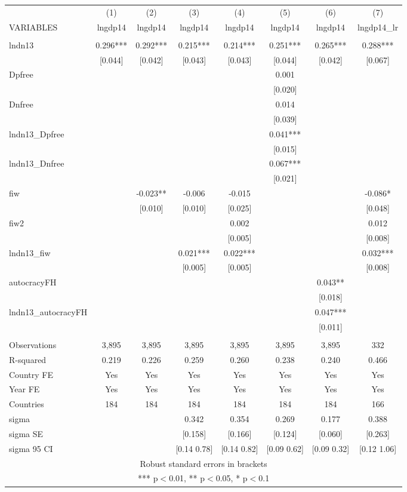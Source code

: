 \begin{tabular}{lccccccc} \hline
 & (1) & (2) & (3) & (4) & (5) & (6) & (7) \\
VARIABLES & lngdp14 & lngdp14 & lngdp14 & lngdp14 & lngdp14 & lngdp14 & lngdp14\_lr \\ \hline
 &  &  &  &  &  &  &  \\
lndn13 & 0.296*** & 0.292*** & 0.215*** & 0.214*** & 0.251*** & 0.265*** & 0.288*** \\
 & [0.044] & [0.042] & [0.043] & [0.043] & [0.044] & [0.042] & [0.067] \\
Dpfree &  &  &  &  & 0.001 &  &  \\
 &  &  &  &  & [0.020] &  &  \\
Dnfree &  &  &  &  & 0.014 &  &  \\
 &  &  &  &  & [0.039] &  &  \\
lndn13\_Dpfree &  &  &  &  & 0.041*** &  &  \\
 &  &  &  &  & [0.015] &  &  \\
lndn13\_Dnfree &  &  &  &  & 0.067*** &  &  \\
 &  &  &  &  & [0.021] &  &  \\
fiw &  & -0.023** & -0.006 & -0.015 &  &  & -0.086* \\
 &  & [0.010] & [0.010] & [0.025] &  &  & [0.048] \\
fiw2 &  &  &  & 0.002 &  &  & 0.012 \\
 &  &  &  & [0.005] &  &  & [0.008] \\
lndn13\_fiw &  &  & 0.021*** & 0.022*** &  &  & 0.032*** \\
 &  &  & [0.005] & [0.005] &  &  & [0.008] \\
autocracyFH &  &  &  &  &  & 0.043** &  \\
 &  &  &  &  &  & [0.018] &  \\
lndn13\_autocracyFH &  &  &  &  &  & 0.047*** &  \\
 &  &  &  &  &  & [0.011] &  \\
 &  &  &  &  &  &  &  \\
Observations & 3,895 & 3,895 & 3,895 & 3,895 & 3,895 & 3,895 & 332 \\
R-squared & 0.219 & 0.226 & 0.259 & 0.260 & 0.238 & 0.240 & 0.466 \\
Country FE & Yes & Yes & Yes & Yes & Yes & Yes & Yes \\
Year FE & Yes & Yes & Yes & Yes & Yes & Yes & Yes \\
Countries & 184 & 184 & 184 & 184 & 184 & 184 & 166 \\
sigma &  &  & 0.342 & 0.354 & 0.269 & 0.177 & 0.388 \\
sigma SE &  &  & [0.158] & [0.166] & [0.124] & [0.060] & [0.263] \\
 sigma 95 CI &  &  & [0.14 0.78] & [0.14 0.82] & [0.09 0.62] & [0.09 0.32] & [0.12 1.06] \\ \hline
\multicolumn{8}{c}{ Robust standard errors in brackets} \\
\multicolumn{8}{c}{ *** p$<$0.01, ** p$<$0.05, * p$<$0.1} \\
\end{tabular}
